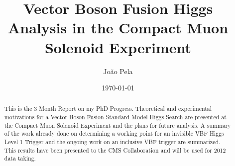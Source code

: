 \documentclass[%
 reprint,
 amsmath,
 amssymb,
 aps,
 pra,
 showkeys
]{revtex4-1}
\begin{document}

\title{Vector Boson Fusion Higgs Analysis in the Compact Muon Solenoid Experiment}


\author{João Pela}


\date{\today}

\begin{abstract}
This is the 3 Month Report on my PhD Progress. Theoretical and experimental motivations for a Vector Boson Fusion 
Standard Model Higgs Search are presented at the Compact Muon Solenoid Experiment and the plans for future
analysis. A summary of the work already done on determining a working point for an invisible VBF Higgs Level 
1 Trigger and the ongoing work on an inclusive VBF trigger are summarized. This results have been presented 
to the CMS Collaboration and will be used for 2012 data taking. 
\end{abstract}


\maketitle
\end{document}
